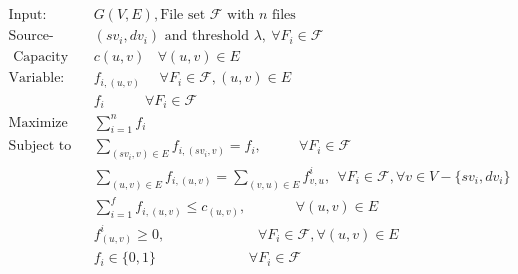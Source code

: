 \documentclass[onecolumn,11pt,journal, compsoc]{IEEEtran}
\begin{document}
	\begin{equation}
		\begin{aligned}
			\text{Input: Directed Connection Graph } &G(V, E), \text{File set } \mathcal{F} \text{ with } n \text{ files} \\
			\text{Source-sink~pair }&(sv_i, dv_i) \text{ and threshold }\lambda, ~\forall F_i \in \mathcal{F} \\
			\text{ Capacity }&c(u, v) ~~~~\forall (u, v)\in E \\
			\text{Variable: Flow } &f_{i, (u, v)} ~~~~~~\forall F_i \in \mathcal{F}, (u, v) \in E \\
			&f_i  ~~~~~~~~~~~~~\forall F_i \in \mathcal{F} \\
			\text{Maximize } &\sum_{i=1}^{n}f_i \\ 
			\text{Subject to } &\sum_{(sv_i,v) \in E}f_{i, (sv_i,v)} = f_i,  ~~~~~~~~~~~~\forall F_i \in \mathcal{F} \\
			&\sum_{(u, v) \in E}f_{i,(u, v)} = \sum_{(v, u) \in E}f_{v, u}^i,  ~~\forall F_i \in \mathcal{F}, \forall v \in V - \{sv_i,dv_i\} \\ 
			&\sum_{i=1}^{f}f_{i,(u, v)} \leq c_{(u, v)}, ~~~~~~~~~~~~~~~~\forall (u, v) \in E \\
			&f_{(u, v)}^i \geq 0, ~~~~~~~~~~~~~~~~~~~~~~~~~~~~~~\forall F_i \in \mathcal{F},  \forall (u, v) \in E \\
			&f_i \in \{0, 1\} ~~~~~~~~~~~~~~~~~~~~~~~~~~~~~~\forall F_i \in \mathcal{F}
		\end{aligned}
	\end{equation}
	
\newpage
	
\end{document}
